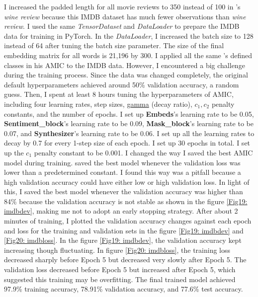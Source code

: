 \documentclass[aoas]{imsart}
\numberwithin{equation}{section}
\theoremstyle{plain}
\theoremstyle{remark}
\begin{document}
I increased the padded length for all movie reviews to 350 instead of 100 in \cite{chenyu}'s \textit{wine review} because this IMDB dataset has much fewer observations than \textit{wine review}. I used the same \textit{TensorDataset} and \textit{DataLoader} to prepare the IMDB data for training in PyTorch. In the \textit{DataLoader}, I increased the batch size to 128 instead of 64 after tuning the batch size parameter. The size of the final embedding matrix for all words is 21,196 by 300. I applied all the same \cite{chenyu}'s defined classes in his AMIC to the IMDB data. However, I encountered a big challenge during the training process. Since the data was changed completely, the original default hyperparameters achieved around 50\% validation accuracy, a random guess. Then, I spent at least 8 hours tuning the hyperparameters of AMIC, including four learning rates, step sizes, \href{https://pytorch.org/docs/stable/generated/torch.optim.lr_scheduler.StepLR.html}{gamma} (decay ratio), $c_1, c_2$ penalty constants, and the number of epochs. I set up \textbf{Embeds}'s learning rate to be 0.05, \textbf{Sentiment\_block}'s learning rate to be 0.09, \textbf{Mask\_block}'s learning rate to be 0.07, and \textbf{Synthesizer}'s learning rate to be 0.06. I set up all the learning rates to decay by 0.7 for every 1-step size of each epoch. I set up 30 epochs in total. I set up the $c_1$ penalty constant to be 0.001. I changed the way I saved the best AMIC model during training. \cite{chenyu} saved the best model whenever the validation loss was lower than a predetermined constant. I found this way was a pitfall because a high validation accuracy could have either low or high validation loss. In light of this, I saved the best model whenever the validation accuracy was higher than 84\% because the validation accuracy is not stable as shown in the figure \ref{Fig19: imdbdev}, making me not to adopt an early stopping strategy. After about 2 minutes of training, I plotted the validation accuracy changes against each epoch and loss for the training and validation sets in the figure \ref{Fig19: imdbdev} and \ref{Fig20: imdbloss}. In the figure \ref{Fig19: imdbdev}, the validation accuracy kept increasing though fluctuating. In figure \ref{Fig20: imdbloss}, the training loss decreased sharply before Epoch 5 but decreased very slowly after Epoch 5. The validation loss decreased before Epoch 5 but increased after Epoch 5, which suggested this training may be overfitting. The final trained model achieved 97.9\% training accuracy, 78.91\% validation accuracy, and 77.6\% test accuracy. 
\end{document}
